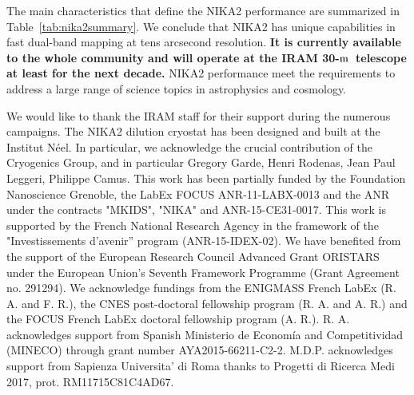 \documentclass[traditionalabstract]{aa}
\newcommand{\trentemetre}{30-$\rm{m}$}
\newcommand{\lp}[1]{\bf \color[RGB]{230, 0, 92} #1}
\begin{document}
The main characteristics that define the NIKA2 performance are
summarized in Table~\ref{tab:nika2summary}.
We conclude that NIKA2 has unique capabilities in fast dual-band
mapping at tens arcsecond resolution. {\lp It is currently available to the
whole community and will operate at the IRAM \trentemetre\ telescope
at least for the next decade.}
NIKA2 performance meet the requirements
to address a large range of science topics in astrophysics and
cosmology. 




%


\begin{acknowledgements}
  We would like to thank the IRAM staff for their support during the
  numerous campaigns. 
  The NIKA2 dilution cryostat has been designed and built at the Institut N\'eel. 
  In particular, we acknowledge the crucial contribution of the Cryogenics Group, and 
  in particular Gregory Garde, Henri Rodenas, Jean Paul Leggeri, Philippe Camus. 
  This work has been partially funded by the Foundation Nanoscience
  Grenoble, the LabEx FOCUS ANR-11-LABX-0013 and the ANR under the
  contracts "MKIDS", "NIKA" and ANR-15-CE31-0017. This work is
  supported by the French National Research Agency in the framework of
  the "Investissements d’avenir” program (ANR-15-IDEX-02).
  We have benefited from the support of the European Research Council Advanced
  Grant ORISTARS under the European Union's Seventh Framework
  Programme (Grant Agreement no. 291294). We acknowledge fundings from
  the ENIGMASS French LabEx (R. A. and F. R.), the CNES post-doctoral
  fellowship program (R. A. and A. R.) and the FOCUS French LabEx
  doctoral fellowship program (A. R.). R. A. acknowledges support from
  Spanish Ministerio de Econom\'ia and Competitividad (MINECO) through
  grant number AYA2015-66211-C2-2. M.D.P. acknowledges support from
  Sapienza Universita' di Roma thanks to Progetti di Ricerca Medi 2017,
  prot. RM11715C81C4AD67. 
\end{acknowledgements}
\end{document}
